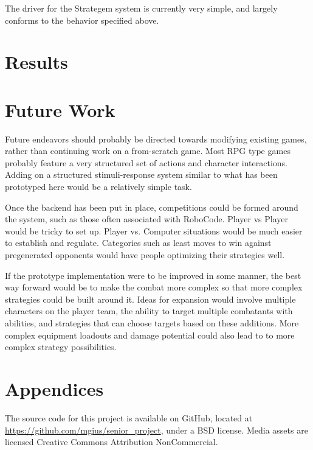 \documentclass[11pt]{article}
\begin{document}
The driver for the Strategem system is currently very simple, and largely conforms to the behavior specified above.  

\singlespacing
{}
\doublespacing

\section{Results} 

\section{Future Work}

Future endeavors should probably be directed towards modifying existing games, rather than continuing work on a from-scratch game.  Most RPG type games probably feature a very structured set of actions and character interactions.  Adding on a structured stimuli-response system similar to what has been prototyped here would be a relatively simple task.

Once the backend has been put in place, competitions could be formed around the system, such as those often associated with RoboCode.  Player vs Player would be tricky to set up.  Player vs. Computer situations would be much easier to establish and regulate.  Categories such as least moves to win against pregenerated opponents would have people optimizing their strategies well. 

If the prototype implementation were to be improved in some manner, the best way forward would be to make the combat more complex so that more complex strategies could be built around it.  Ideas for expansion would involve multiple characters on the player team, the ability to target multiple combatants with abilities, and strategies that can choose targets based on these additions. More complex equipment loadouts and damage potential could also lead to to more complex strategy possibilities.

\section{Appendices}

The source code for this project is available on GitHub, located at \url{https://github.com/mgius/senior_project}, under a BSD license.  Media assets are licensed Creative Commons Attribution NonCommercial.





\end{document}
